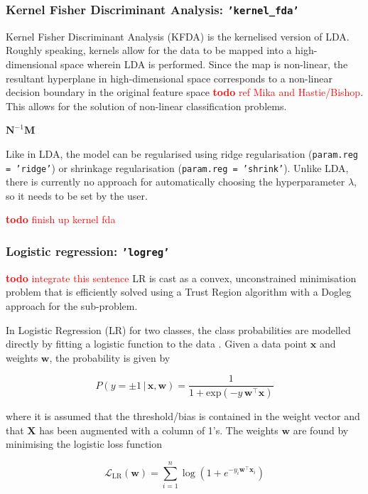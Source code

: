 \documentclass[utf8]{frontiersSCNS} %
\newcommand{\w}{\mathbf{w}}
\newcommand{\x}{\mathbf{x}}
\renewcommand{\L}{\mathcal{L}}
\newcommand{\X}{\mathbf{X}}
\newcommand{\ttt}[1]{\texttt{#1}}
\newcommand{\todo}[1]{\textcolor{red}{\textbf{todo} #1}}
\begin{document}
\subsubsection{Kernel Fisher Discriminant Analysis: \ttt{'kernel\_fda'}}

Kernel Fisher Discriminant Analysis (KFDA) is the kernelised version of LDA. Roughly speaking, kernels allow for the data to be mapped into a high-dimensional space wherein LDA is performed. Since the map is non-linear, the resultant hyperplane in high-dimensional space corresponds to a non-linear decision boundary in the original feature space \todo{ref Mika and Hastie/Bishop}. This allows for the solution of non-linear classification problems.

$\mathbf{N}^{-1} \mathbf{M}$

Like in LDA, the model can be regularised using ridge regularisation (\ttt{param.reg = 'ridge'}) or shrinkage regularisation (\ttt{param.reg = 'shrink'}). Unlike LDA, there is currently no approach for automatically choosing the hyperparameter $\lambda$, so it needs to be set by the user.

\todo{finish up kernel fda}

\subsubsection{Logistic regression: \ttt{'logreg'}}

\todo{integrate this sentence} LR is cast as a convex, unconstrained minimisation problem that is efficiently solved using a Trust Region algorithm with a Dogleg approach for the sub-problem. 

In Logistic Regression (LR) for two classes, the class probabilities are modelled directly by fitting a logistic function to the data \citep{Hastie2009}. Given a data point $\x$ and weights $\w$, the probability is given by

\begin{equation}
\label{eq:logreg_probability}
P(y = \pm 1\,|\,\x,\w) = \frac{1}{1 + \text{exp}(-y\,\w^\top\x)}
\end{equation}

where it is assumed that the threshold/bias is contained in the weight vector and that $\X$ has been augmented with a column of 1's. The weights $\w$ are found by minimising the logistic loss function

\begin{equation}
\label{eq:logreg_loss_function}
\L_\text{LR}(\w) = \sum_{i=1}^n \log(1 + e^{-y_i\w^\top\x_i})
\end{equation}
\end{document}
